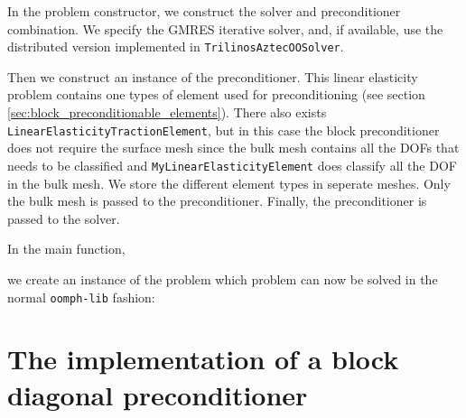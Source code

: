In the problem constructor, we construct the solver and preconditioner combination. We specify the GMRES iterative solver, and, if available, use the distributed version implemented in \verb+TrilinosAztecOOSolver+.
\lstset{numberstyle=\scriptsize,breaklines=true, numbers=left, stepnumber=2, frame=single,basicstyle=\ttfamily\scriptsize, showstringspaces=false, language=C++}

Then we construct an instance of the preconditioner. This linear elasticity problem contains one types of element used for preconditioning (see section \ref{sec:block_preconditionable_elements}). There also exists \verb+LinearElasticityTractionElement+, but in this case the block preconditioner does not require the surface mesh since the bulk mesh contains all the DOFs that needs to be classified and \verb+MyLinearElasticityElement+ does classify all the DOF in the bulk mesh. We store
the different element types in seperate meshes. Only the bulk mesh is passed to the preconditioner. Finally, the preconditioner is passed to the 
solver.
\lstset{numberstyle=\scriptsize,breaklines=true, numbers=left, stepnumber=2, frame=single,basicstyle=\ttfamily\scriptsize, showstringspaces=false, language=C++}

In the main function,
\lstset{numberstyle=\scriptsize,breaklines=true, numbers=left, stepnumber=2, frame=single,basicstyle=\ttfamily\scriptsize, showstringspaces=false, language=C++}

we create an instance of the  problem which problem can now be solved in the normal \verb+oomph-lib+ fashion:
\lstset{numberstyle=\scriptsize,breaklines=true, numbers=left, stepnumber=2, frame=single,basicstyle=\ttfamily\scriptsize, showstringspaces=false, language=C++}



\section{The implementation of a block diagonal preconditioner\label{sec:the_implementation_of_a_block_diagonal_preconditioner}}

